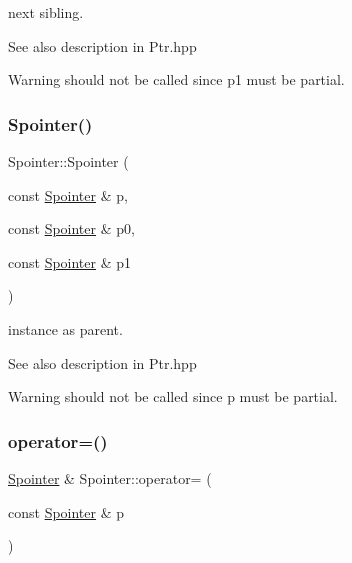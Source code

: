 next sibling. 

\begin{DoxySeeAlso}{See also}
description in Ptr.\+hpp 
\end{DoxySeeAlso}
\begin{DoxyWarning}{Warning}
should not be called since p1 must be partial. 
\end{DoxyWarning}
\mbox{\label{group__table_gad078973f8318ccf5800db79e87584dcc}} 
\subsubsection{\texorpdfstring{Spointer()}{Spointer()}\hspace{0.1cm}{\footnotesize\ttfamily [4/4]}}
{\footnotesize\ttfamily Spointer\+::\+Spointer (\begin{DoxyParamCaption}\item[{const \mbox{\hyperlink{classSpointer}{Spointer}} \&}]{p,  }\item[{const \mbox{\hyperlink{classSpointer}{Spointer}} \&}]{p0,  }\item[{const \mbox{\hyperlink{classSpointer}{Spointer}} \&}]{p1 }\end{DoxyParamCaption})}



instance as parent. 

\begin{DoxySeeAlso}{See also}
description in Ptr.\+hpp 
\end{DoxySeeAlso}
\begin{DoxyWarning}{Warning}
should not be called since p must be partial. 
\end{DoxyWarning}
\mbox{\label{group__table_ga88eb3c521aa1c9bc9b8891f20b9a01eb}} 
\subsubsection{\texorpdfstring{operator=()}{operator=()}\hspace{0.1cm}{\footnotesize\ttfamily [1/5]}}
{\footnotesize\ttfamily \mbox{\hyperlink{classSpointer}{Spointer}} \& Spointer\+::operator= (\begin{DoxyParamCaption}\item[{const \mbox{\hyperlink{classSpointer}{Spointer}} \&}]{p }\end{DoxyParamCaption})\hspace{0.3cm}{\ttfamily [virtual]}}

